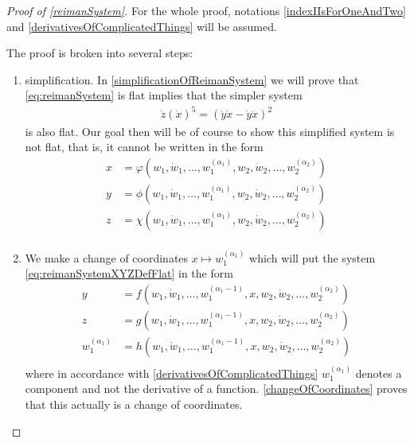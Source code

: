 \documentclass[12pt]{article}
\begin{document}
\begin{proof}[ Proof of \ref{reimanSystem}]
For the whole proof, notations \ref{indexIIsForOneAndTwo} and \ref{derivativesOfComplicatedThings} will be assumed.

The proof is broken into several steps:
\begin{enumerate}
  \item simplification. In \ref{simplificationOfReimanSystem} we will prove that
    \eqref{eq:reimanSystem} is flat implies that the simpler system
    \begin{equation}\begin{aligned} \label{reimanSysXYZ}
      \dot{z} (\dot{x})^5 = (\ddot{y}\dot{x} - \dot{y}\ddot{x})^2
    \end{aligned}\end{equation}
    is also flat. Our goal then will be of course to show this simplified system is not flat, that is, it cannot be written in the form
    \begin{equation}\begin{aligned}\label{eq:reimanSystemXYZDefFlat}
  x &= \varphi( w_1, \dot{w}_1, \ldots, w_1^{(\alpha_1)}, w_2, \dot{w}_2, \ldots, w_2^{(\alpha_2)} ) \\
  y &= \phi( w_1, \dot{w}_1, \ldots, w_1^{(\alpha_1)}, w_2, \dot{w}_2, \ldots, w_2^{(\alpha_2)} ) \\
  z &= \chi( w_1, \dot{w}_1, \ldots, w_1^{(\alpha_1)}, w_2, \dot{w}_2, \ldots, w_2^{(\alpha_2)} ) \\
\end{aligned}\end{equation}
    
  \item We make a change of coordinates $x \mapsto w_1^{(\alpha_1)}$ which will put the system \eqref{eq:reimanSystemXYZDefFlat} in the form
\begin{equation}\begin{aligned} \label{eq:reimanSystemFGH}
  y &= f( w_1, \dot{w}_1, \ldots, w_1^{(\alpha_1 - 1)}, x, w_2, \dot{w}_2, \ldots, w_2^{(\alpha_2)} ) \\
  z &= g( w_1, \dot{w}_1, \ldots, w_1^{(\alpha_1 - 1)}, x, w_2, \dot{w}_2, \ldots, w_2^{(\alpha_2)} ) \\
  w_1^{(\alpha_1)} &= h( w_1, \dot{w}_1, \ldots, w_1^{(\alpha_1 - 1)}, x, w_2, \dot{w}_2, \ldots,   w_2^{(\alpha_2)} ) \\
\end{aligned}\end{equation}
    where in accordance with \ref{derivativesOfComplicatedThings} $w_1^{(\alpha_1)}$ denotes a component and not the derivative of a function.
    \ref{changeOfCoordinates} proves that this actually is a change of coordinates.
    

\end{enumerate}
\end{proof}
\end{document}
